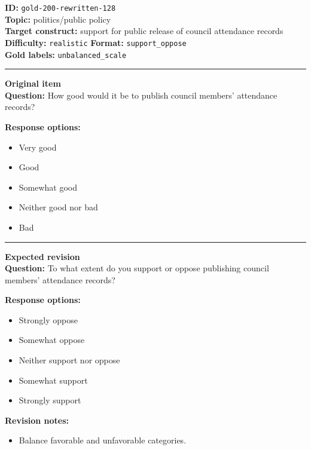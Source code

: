 \documentclass[10pt,a4paper]{article}
\newcommand{\sectionline}{\vspace{0.15em}\hrule\vspace{0.35em}}
\begin{document}
\begin{tcolorbox}[colframe=FlawRed,colback=white,colbacktitle=FlawRed!9,coltitle=black,title={Item 128\hfill Flawed item}]
\textbf{ID:} \texttt{gold-200-rewritten-128}\\
\textbf{Topic:} politics/public policy\\
\textbf{Target construct:} support for public release of council attendance records\\
\textbf{Difficulty:} \texttt{realistic} \quad \textbf{Format:} \texttt{support\_oppose}\\
\textbf{Gold labels:} \texttt{unbalanced\_scale}\\
\sectionline
\textbf{Original item}\\
\textbf{Question:} How good would it be to publish council members' attendance records?
\par\textbf{Response options:}
\begin{itemize}
\item Very good
\item Good
\item Somewhat good
\item Neither good nor bad
\item Bad
\end{itemize}
\sectionline
\textbf{Expected revision}\\
\textbf{Question:} To what extent do you support or oppose publishing council members' attendance records?
\par\textbf{Response options:}
\begin{itemize}
\item Strongly oppose
\item Somewhat oppose
\item Neither support nor oppose
\item Somewhat support
\item Strongly support
\end{itemize}
\par\textbf{Revision notes:}
\begin{itemize}
\item Balance favorable and unfavorable categories.
\end{itemize}
\end{tcolorbox}
\end{document}
